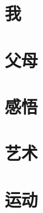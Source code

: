 \documentclass[10pt]{ctexbook}
\begin{document}

\frontmatter

\tableofcontents
\mainmatter


\part{我}




\part{父母}




\part{感悟}





\part{艺术}


\part{运动}





\backmatter
\end{document}
